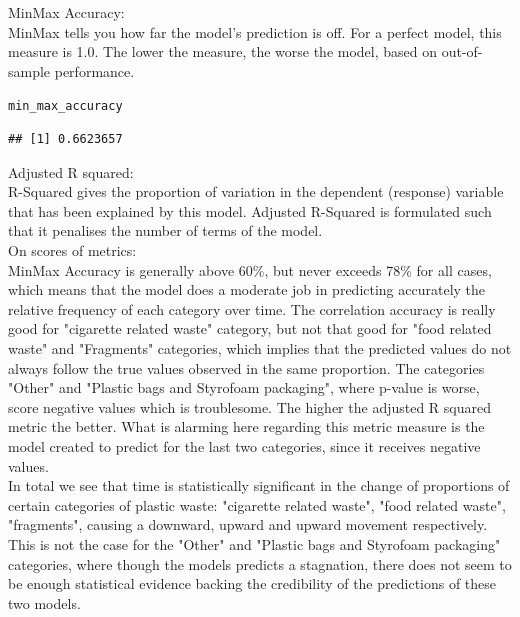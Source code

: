 \documentclass[10pt]{article}\usepackage[]{graphicx}\usepackage[]{color}
\makeatletter
\newcommand{\hlstd}[1]{\textcolor[rgb]{0.345,0.345,0.345}{#1}}%
\newenvironment{kframe}{%
 \def\at@end@of@kframe{}%
 \ifinner\ifhmode%
  \def\at@end@of@kframe{\end{minipage}}%
  \begin{minipage}{\columnwidth}%
 \fi\fi%
 \def\FrameCommand##1{\hskip\@totalleftmargin \hskip-\fboxsep
 \colorbox{shadecolor}{##1}\hskip-\fboxsep
     \hskip-\linewidth \hskip-\@totalleftmargin \hskip\columnwidth}%
 \MakeFramed {\advance\hsize-\width
   \@totalleftmargin\z@ \linewidth\hsize
   \@setminipage}}%
 {\par\unskip\endMakeFramed%
 \at@end@of@kframe}
\newenvironment{knitrout}{}{} %
\makeatother
\begin{document}
MinMax Accuracy:\\
MinMax tells you how far the model's prediction is off. For a perfect model, this measure is 1.0. The lower the measure, the worse the model, based on out-of-sample performance.\\


\begin{knitrout}\small
{}\color{fgcolor}\begin{kframe}
\begin{alltt}
\hlstd{min_max_accuracy}
\end{alltt}
\begin{verbatim}
## [1] 0.6623657
\end{verbatim}
\end{kframe}
\end{knitrout}

Adjusted R squared:\\
R-Squared gives the proportion of variation in the dependent (response) variable that has been explained by this model. Adjusted R-Squared is formulated such that it penalises the number of terms of the model.\\


On scores of metrics:\\

MinMax Accuracy is generally above 60\%, but never exceeds 78\% for all cases, which means that the model does a moderate job in predicting accurately the relative frequency of each category over time. The correlation accuracy is really good for "cigarette related waste" category, but not that good for "food related waste" and "Fragments" categories, which implies that the predicted values do not always follow the true values observed in the same proportion. The categories "Other" and "Plastic bags and Styrofoam packaging", where p-value is worse, score negative values which is troublesome. The higher the adjusted R squared metric the better. What is alarming here regarding this metric measure is the model created to predict for the last two categories, since it receives negative values.\\

In total we see that time is statistically significant in the change of proportions of certain categories
of plastic waste: "cigarette related waste", "food related waste", "fragments", causing a downward, upward and upward movement respectively. This is not the case for the "Other" and "Plastic bags and Styrofoam packaging" categories, where though the models predicts a stagnation, there does not seem to be enough statistical evidence backing the credibility of the predictions of these two models.\\
\end{document}
